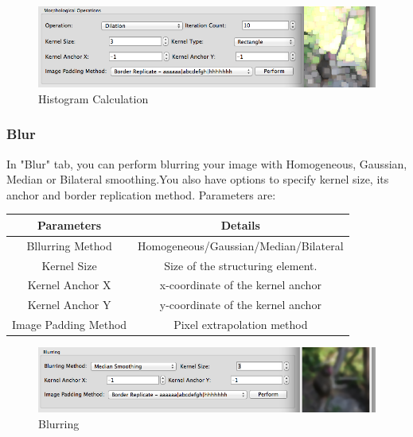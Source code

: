 \documentclass{article}
\begin{document}
\begin{figure}[H]
\begin{center}
\includegraphics[scale=0.5]{toolboxMorph.png}
\caption{Histogram Calculation}
\end{center}
\end{figure}	

\subsubsection{Blur}

In "Blur" tab, you can perform blurring your image with Homogeneous, Gaussian, Median or Bilateral smoothing.You also have options to specify kernel size, its anchor and border replication method. Parameters are:

\begin{table}[H]
\begin{center}
\begin{tabular}{|c|c|l|l|l|}
\hline
\textbf{Parameters}  & \multicolumn{4}{|c|}{\textbf{Details}}                                                          \\ \hline
Bllurring Method            & \multicolumn{4}{|c|}{Homogeneous/Gaussian/Median/Bilateral} \\ \hline
Kernel Size          & \multicolumn{4}{|c|}{Size of the structuring element.}                                          \\ \hline
Kernel Anchor X      & \multicolumn{4}{|c|}{x-coordinate of the kernel anchor}                                         \\ \hline
Kernel Anchor Y      & \multicolumn{4}{|c|}{y-coordinate of the kernel anchor}                                         \\ \hline
Image Padding Method & \multicolumn{4}{|c|}{Pixel extrapolation method}                                                \\ \hline
\end{tabular}
\end{center}
\end{table}

\begin{figure}[H]
\begin{center}
\includegraphics[scale=0.5]{toolboxBlur.png}
\caption{Blurring}
\end{center}
\end{figure}	
\end{document}
